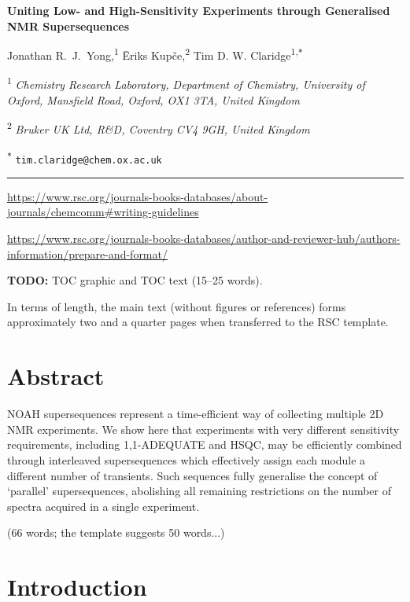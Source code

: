 \documentclass[a4paper,12pt]{article}
\newcommand{\articletitle}{\todo{Uniting Low- and High-Sensitivity Experiments through Generalised NMR Supersequences}}
\newcommand{\crl}{Chemistry Research Laboratory, Department of Chemistry, University of Oxford, Mansfield Road, Oxford, OX1 3TA, United Kingdom}
\newcommand{\brukeruk}{Bruker UK Ltd, R\&D, Coventry CV4 9GH, United Kingdom}
\newcommand{\todo}[1]{{\color{OrangeRed}#1}}
\begin{document}
\begin{refsection}

\begin{center}   %
    \textbf{\Large \articletitle{}}

    \vspace{0.2cm}

    Jonathan R.\ J.\ Yong,\textsuperscript{1} {\=E}riks Kup{\v{c}}e,\textsuperscript{2} Tim D. W. Claridge\textsuperscript{1,\texttt{*}}

    \vspace{0.2cm}

    \textsuperscript{1} \textit{\crl{}}

    \textsuperscript{2} \textit{\brukeruk{}}

    \textsuperscript{\texttt{*}} \texttt{tim.claridge@chem.ox.ac.uk}

    \vspace{0.5cm} \hrule

\end{center}

\small{
    \url{https://www.rsc.org/journals-books-databases/about-journals/chemcomm#writing-guidelines}

    \url{https://www.rsc.org/journals-books-databases/author-and-reviewer-hub/authors-information/prepare-and-format/}
}

\todo{\textbf{TODO:} TOC graphic and TOC text (15--25 words).}

\todo{In terms of length, the main text (without figures or references) forms approximately two and a quarter pages when transferred to the RSC template.}

\section*{Abstract}

NOAH supersequences represent a time-efficient way of collecting multiple 2D NMR experiments. 
We show here that experiments with very different sensitivity requirements, including 1,1-ADEQUATE and HSQC, may be efficiently combined through interleaved supersequences which effectively assign each module a different number of transients.
Such sequences fully generalise the concept of `parallel' supersequences, abolishing all remaining restrictions on the number of spectra acquired in a single experiment.

\todo{(66 words; the template suggests 50 words...)}

\section{Introduction}


\end{refsection}
\end{document}

